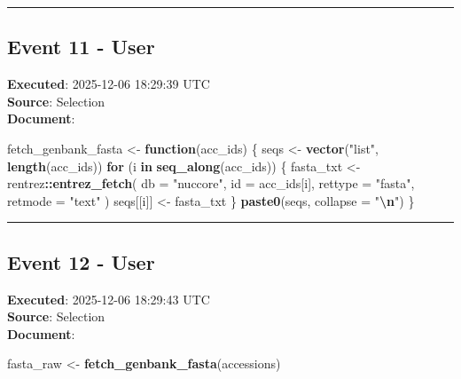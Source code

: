 \documentclass[
  11pt,
]{article}
\newenvironment{Shaded}{\begin{snugshade}}{\end{snugshade}}
\newcommand{\AttributeTok}[1]{\textcolor[rgb]{0.13,0.29,0.53}{#1}}
\newcommand{\ControlFlowTok}[1]{\textcolor[rgb]{0.13,0.29,0.53}{\textbf{#1}}}
\newcommand{\FunctionTok}[1]{\textcolor[rgb]{0.13,0.29,0.53}{\textbf{#1}}}
\newcommand{\NormalTok}[1]{#1}
\newcommand{\OtherTok}[1]{\textcolor[rgb]{0.56,0.35,0.01}{#1}}
\newcommand{\SpecialCharTok}[1]{\textcolor[rgb]{0.81,0.36,0.00}{\textbf{#1}}}
\newcommand{\StringTok}[1]{\textcolor[rgb]{0.31,0.60,0.02}{#1}}
\begin{document}
\begin{center}\rule{0.5\linewidth}{0.5pt}\end{center}

\subsection{Event 11 - User}\label{event-11---user}

\textbf{Executed}: 2025-12-06 18:29:39 UTC\\
\textbf{Source}: Selection\\
\textbf{Document}:

\begin{Shaded}
\begin{Highlighting}[]
\NormalTok{fetch\_genbank\_fasta }\OtherTok{\textless{}{-}} \ControlFlowTok{function}\NormalTok{(acc\_ids) \{}
\NormalTok{  seqs }\OtherTok{\textless{}{-}} \FunctionTok{vector}\NormalTok{(}\StringTok{"list"}\NormalTok{, }\FunctionTok{length}\NormalTok{(acc\_ids))}
  \ControlFlowTok{for}\NormalTok{ (i }\ControlFlowTok{in} \FunctionTok{seq\_along}\NormalTok{(acc\_ids)) \{}
\NormalTok{    fasta\_txt }\OtherTok{\textless{}{-}}\NormalTok{ rentrez}\SpecialCharTok{::}\FunctionTok{entrez\_fetch}\NormalTok{(}
      \AttributeTok{db   =} \StringTok{"nuccore"}\NormalTok{,}
      \AttributeTok{id   =}\NormalTok{ acc\_ids[i],}
      \AttributeTok{rettype =} \StringTok{"fasta"}\NormalTok{,}
      \AttributeTok{retmode =} \StringTok{"text"}
\NormalTok{    )}
\NormalTok{    seqs[[i]] }\OtherTok{\textless{}{-}}\NormalTok{ fasta\_txt}
\NormalTok{  \}}
  \FunctionTok{paste0}\NormalTok{(seqs, }\AttributeTok{collapse =} \StringTok{"}\SpecialCharTok{\textbackslash{}n}\StringTok{"}\NormalTok{)}
\NormalTok{\}}
\end{Highlighting}
\end{Shaded}

\begin{center}\rule{0.5\linewidth}{0.5pt}\end{center}

\subsection{Event 12 - User}\label{event-12---user}

\textbf{Executed}: 2025-12-06 18:29:43 UTC\\
\textbf{Source}: Selection\\
\textbf{Document}:

\begin{Shaded}
\begin{Highlighting}[]
\NormalTok{fasta\_raw }\OtherTok{\textless{}{-}} \FunctionTok{fetch\_genbank\_fasta}\NormalTok{(accessions)}
\end{Highlighting}
\end{Shaded}
\end{document}
